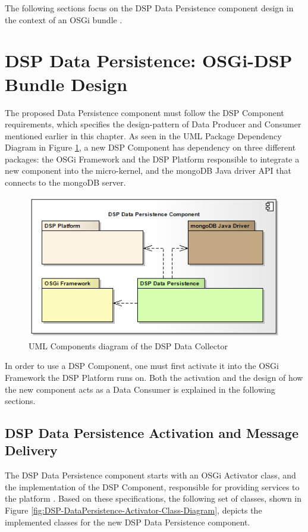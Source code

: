 The following sections focus on the DSP Data Persistence component 
design in the context of an OSGi bundle \cite{osgi}.

\section{DSP Data Persistence: OSGi-DSP Bundle Design}

The proposed Data Persistence component must follow the DSP Component
requirements, which specifies the design-pattern of Data Producer and Consumer
mentioned earlier in this chapter. As seen in the UML Package  Dependency
Diagram in Figure \ref{fig:DSP-Data-Persistence-Packages-Dependency}, a new
DSP Component has dependency on three different packages: the OSGi Framework
and the DSP Platform responsible to integrate a new component into the
micro-kernel, and the mongoDB Java driver API that connects to the mongoDB
server.

\begin{figure}[!h]
  \centering
  \includegraphics[scale=0.65]{../diagrams/DSP-Data-Persistence-Packages-Dependency}
  \caption{UML Components diagram of the DSP Data Collector}
  \label{fig:DSP-Data-Persistence-Packages-Dependency}
\end{figure}

In order to use a DSP Component, one must first activate it into the OSGi
Framework the DSP Platform runs on. Both the activation and the design of how
the new component acts as a Data Consumer is explained in the following
sections.

\subsection{DSP Data Persistence Activation and Message Delivery}

The DSP Data Persistence component starts with an OSGi Activator class, and 
the implementation of the DSP Component, responsible for providing services 
to the platform \cite{netbeams-dsp-architecture}. Based on these 
specifications, the following set of classes, shown in Figure 
\ref{fig:DSP-DataPersistence-Activator-Class-Diagram}, depicts the implemented
classes for the new DSP Data Persistence component.

